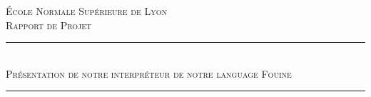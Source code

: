 \documentclass[14pt,a4paper]{extarticle}
\newcommand{\HRule}{\rule{\linewidth}{0.5mm}}
\begin{document}
\begin{titlepage}
    \begin{sffamily}
        \begin{center}


            \textsc{\LARGE École Normale Supérieure de Lyon}\\[3cm]

            \textsc{\Large Rapport de Projet}\\[2.5cm]

            \HRule \\[0.4cm]
            \textsc{\huge Présentation de notre interpréteur de notre language Fouine}
            \HRule \\[3cm]


\end{center}
\end{sffamily}
\end{titlepage}
\end{document}
